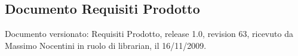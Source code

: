 \subsection{Documento Requisiti Prodotto}
Documento versionato: Requisiti Prodotto, release 1.0, revision 63, ricevuto da
Massimo Nocentini in ruolo di librarian, il 16/11/2009.